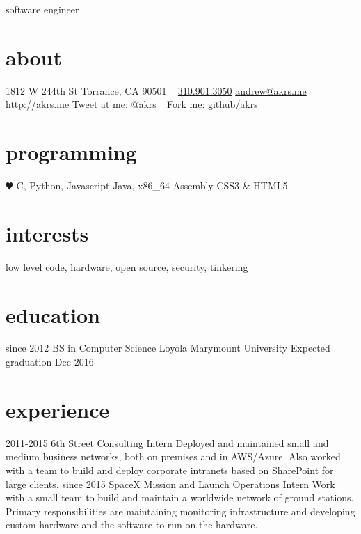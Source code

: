 \documentclass[]{akers-cv}
\begin{document}
       {software engineer}


\begin{aside}
  \section{about}
    1812 W 244th St
    Torrance, CA 90501
    ~
    \href{tel:13109013050}{310.901.3050}
    \href{mailto:andrew@akrs.me}{andrew@akrs.me}
    \href{http://akrs.me}{http://akrs.me}
    Tweet at me: \href{http://twitter.com/akrs_}{@akrs\_}
    Fork me: \href{http://github.com/akrs}{github/akrs}
  \section{programming}
    {\color{red} $\varheartsuit$} C, Python, Javascript
    Java, x86\_64 Assembly
    CSS3 \& HTML5
\end{aside}

\section{interests}

low level code, hardware, open source, security, tinkering

\section{education}

\begin{entrylist}
  \entry
    {since 2012}
    {BS in Computer Science}
    {Loyola Marymount University}
    {Expected graduation Dec 2016}
\end{entrylist}

\section{experience}

\begin{entrylist}
  \entry
    {2011-2015}
    {6th Street Consulting}
    {Intern}
    {Deployed and maintained small and medium business networks, both on premises and in AWS/Azure. Also worked with a team to build and deploy corporate intranets based on SharePoint for large clients.}
  \entry
    {since 2015}
    {SpaceX}
    {Mission and Launch Operations Intern}
    {Work with a small team to build and maintain a worldwide network of ground stations. Primary responsibilities are maintaining monitoring infrastructure and developing custom hardware and the software to run on the hardware.}
\end{entrylist}
\end{document}
